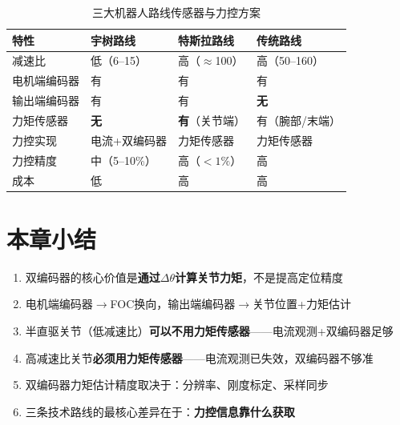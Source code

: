\begin{table}[H]
\centering
\begin{tabular}{p{2.5cm}p{3cm}p{3cm}p{3cm}}
\toprule
\textbf{特性} & \textbf{宇树路线} & \textbf{特斯拉路线} & \textbf{传统路线} \\
\midrule
减速比 & 低（6--15） & 高（$\approx$100） & 高（50--160） \\
电机端编码器 & 有 & 有 & 有 \\
输出端编码器 & 有 & 有 & \textbf{无} \\
力矩传感器 & \textbf{无} & \textbf{有}（关节端） & 有（腕部/末端） \\
力控实现 & 电流+双编码器 & 力矩传感器 & 力矩传感器 \\
力控精度 & 中（5--10\%） & 高（$<1\%$） & 高 \\
成本 & 低 & 高 & 高 \\
\bottomrule
\end{tabular}
\caption{三大机器人路线传感器与力控方案}
\label{tab:three_approaches}
\end{table}

\section*{本章小结}

\begin{summarybox}{}
\begin{enumerate}
  \item 双编码器的核心价值是\textbf{通过$\Delta\theta$计算关节力矩}，不是提高定位精度
  \item 电机端编码器$\rightarrow$FOC换向，输出端编码器$\rightarrow$关节位置+力矩估计
  \item 半直驱关节（低减速比）\textbf{可以不用力矩传感器}——电流观测+双编码器足够
  \item 高减速比关节\textbf{必须用力矩传感器}——电流观测已失效，双编码器不够准
  \item 双编码器力矩估计精度取决于：分辨率、刚度标定、采样同步
  \item 三条技术路线的最核心差异在于：\textbf{力控信息靠什么获取}
\end{enumerate}
\end{summarybox}

\newpage
